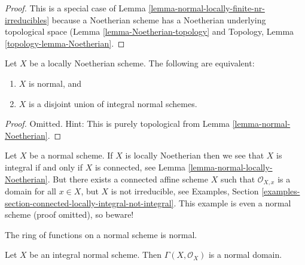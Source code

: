 \begin{proof}
This is a special case of
Lemma \ref{lemma-normal-locally-finite-nr-irreducibles} because a Noetherian
scheme has a Noetherian underlying topological space
(Lemma \ref{lemma-Noetherian-topology}
and
Topology, Lemma \ref{topology-lemma-Noetherian}.
\end{proof}

\begin{lemma}
\label{lemma-normal-locally-Noetherian}
Let $X$ be a locally Noetherian scheme.
The following are equivalent:
\begin{enumerate}
\item $X$ is normal, and
\item $X$ is a disjoint union of integral normal schemes.
\end{enumerate}
\end{lemma}

\begin{proof}
Omitted. Hint: This is purely topological from
Lemma \ref{lemma-normal-Noetherian}.
\end{proof}

\begin{remark}
\label{remark-normal-connected-irreducible}
Let $X$ be a normal scheme. If $X$ is locally Noetherian then we see that
$X$ is integral if and only if $X$ is connected, see
Lemma \ref{lemma-normal-locally-Noetherian}.
But there exists a connected affine scheme $X$ such that
$\mathcal{O}_{X, x}$ is a domain for all $x \in X$, but $X$ is not
irreducible, see Examples, Section
\ref{examples-section-connected-locally-integral-not-integral}.
This example is even a normal scheme (proof omitted), so beware!
\end{remark}

\begin{lemma}
\label{lemma-normal-integral-sections}
\begin{slogan}
The ring of functions on a normal scheme is normal.
\end{slogan}
Let $X$ be an integral normal scheme.
Then $\Gamma(X, \mathcal{O}_X)$ is a normal domain.
\end{lemma}

